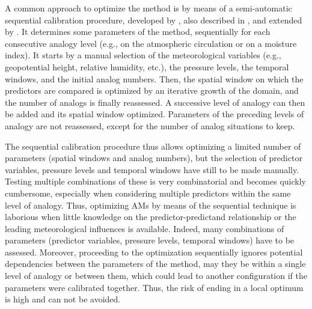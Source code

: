 \documentclass{ametsoc}
\begin{document}
A common approach to optimize the method is by means of a semi-automatic sequential calibration procedure, developed by \citet{Bontron2004}, also described in \citet{BenDaoud2016}, and extended by \citet{Radanovics2013}. It determines some parameters of the method, sequentially for each consecutive analogy level (e.g., on the atmospheric circulation or on a moisture index). It starts by a manual selection of the meteorological variables (e.g., geopotential height, relative humidity, etc.), the pressure levels, the temporal windows, and the initial analog numbers. Then, the spatial window on which the predictors are compared is optimized by an iterative growth of the domain, and the number of analogs is finally reassessed. A successive level of analogy can then be added and its spatial window optimized. Parameters of the preceding levels of analogy are not reassessed, except for the number of analog situations to keep.

The sequential calibration procedure thus allows optimizing a limited number of parameters (spatial windows and analog numbers), but the selection of predictor variables, pressure levels and temporal windows have still to be made manually. Testing multiple combinations of these is very combinatorial and becomes quickly cumbersome, especially when considering multiple predictors within the same level of analogy. Thus, optimizing AMs by means of the sequential technique is laborious when little knowledge on the predictor-predictand relationship or the leading meteorological influences is available. Indeed, many combinations of parameters (predictor variables, pressure levels, temporal windows) have to be assessed. Moreover, proceeding to the optimization sequentially ignores potential dependencies between the parameters of the method, may they be within a single level of analogy or between them, which could lead to another configuration if the parameters were calibrated together. Thus, the risk of ending in a local optimum is high and can not be avoided. 
\end{document}
